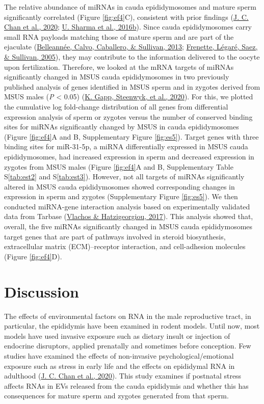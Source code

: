 \documentclass[12pt,twoside]{reedthesis}
\begin{document}
The relative abundance of miRNAs in cauda epididymosomes and mature
sperm significantly correlated (Figure \ref{fig:ef4}C), consistent with prior
findings (\protect\hyperlink{ref-chan_2020}{J. C. Chan et al., 2020}; \protect\hyperlink{ref-sharma_2016}{U. Sharma et al., 2016b}). Since cauda epididymosomes carry
small RNA payloads matching those of mature sperm and are part of the
ejaculate (\protect\hyperlink{ref-belleanne_2013a}{Belleannée, Calvo, Caballero, \& Sullivan, 2013}; \protect\hyperlink{ref-frenette_2005}{Frenette, Légaré, Saez, \& Sullivan, 2005}), they may contribute to the
information delivered to the oocyte upon fertilization. Therefore, we
looked at the mRNA targets of miRNAs significantly changed in MSUS cauda
epididymosomes in two previously published analysis of genes identified
in MSUS sperm and in zygotes derived from MSUS males (\emph{P} \textless{} 0.05)
(\protect\hyperlink{ref-gapp_2020}{K. Gapp, Steenwyk, et al., 2020}). For this, we plotted the cumulative log fold-change
distribution of all genes from differential expression analysis of sperm
or zygotes versus the number of conserved binding sites for miRNAs
significantly changed by MSUS in cauda epididymosomes (Figure \ref{fig:ef4}A and
B, Supplementary Figure \ref{fig:es5}). Target genes with three binding sites
for miR-31-5p, a miRNA differentially expressed in MSUS cauda
epididymosomes, had increased expression in sperm and decreased
expression in zygotes from MSUS males (Figure \ref{fig:ef4}A and B, Supplementary
Table S\ref{tab:est2} and S\ref{tab:est3}). However, not all targets of miRNAs significantly
altered in MSUS cauda epididymosomes showed corresponding changes in
expression in sperm and zygotes (Supplementary Figure \ref{fig:es5}). We then
conducted miRNA-gene interaction analysis based on experimentally
validated data from Tarbase (\protect\hyperlink{ref-vlachos_2017}{Vlachos \& Hatzigeorgiou, 2017}). This analysis showed that,
overall, the five miRNAs significantly changed in MSUS cauda
epididymosomes target genes that are part of pathways involved in
steroid biosynthesis, extracellular matrix (ECM)--receptor interaction,
and cell-adhesion molecules (Figure \ref{fig:ef4}D).

\hypertarget{discussion-1}{%
\section{Discussion}\label{discussion-1}}

The effects of environmental factors on RNA in the male reproductive
tract, in particular, the epididymis have been examined in rodent
models. Until now, most models have used invasive exposure such as
dietary insult or injection of endocrine disruptors, applied prenatally
and sometimes before conception. Few studies have examined the effects
of non-invasive psychological/emotional exposure such as stress in early
life and the effects on epididymal RNA in adulthood (\protect\hyperlink{ref-chan_2020}{J. C. Chan et al., 2020}). This
study examines if postnatal stress affects RNAs in EVs released from the
cauda epididymis and whether this has consequences for mature sperm and
zygotes generated from that sperm.
\end{document}
